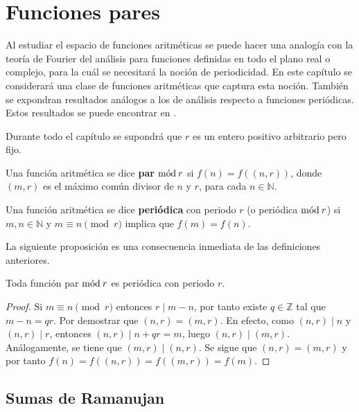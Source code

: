 \newpage
\section{Funciones pares}

Al estudiar el espacio de funciones aritméticas se puede hacer una analogía con la teoría de Fourier del análisis para funciones definidas en todo el plano real o complejo, para la cuál se necesitará la noción de periodicidad. En este capítulo se considerará una clase de funciones aritméticas que captura esta noción. También se expondran resultados análogos a los de análisis respecto a funciones periódicas. Estos resultados se puede encontrar en \cite{Coh1}.

\begin{remark}
Durante todo el capítulo se supondrá que $r$ es un entero positivo arbitrario pero fijo.
\end{remark}

\begin{definition}
Una función aritmética se dice \textbf{par} $\mathrm{m\acute{o}d\:}r$ si $f(n)=f((n,r))$, donde $(m,r)$ es el máximo común divisor de $n$ y $r$, para cada $n \in \mathbb{N}$.
\end{definition}

\begin{definition}
Una función aritmética se dice \textbf{periódica} con periodo $r$ (o periódica $\mathrm{m\acute{o}d\:}r$) si $m, n \in \mathbb{N}$ y $m \equiv n \pmod{r}$ implica que $f(m)=f(n)$.
\end{definition}

La siguiente proposición es una consecuencia inmediata de las definiciones anteriores.

\begin{proposition}\label{prop:mod->per}
Toda función par $\mathrm{m\acute{o}d\:}r$ es periódica con periodo $r$.
\end{proposition}
\begin{proof}
Si $m \equiv n \pmod{r}$ entonces $r \mid m-n$, por tanto existe $q \in \mathbb{Z}$ tal que $m-n=q r$. Por demostrar que $(n,r)=(m,r)$. En efecto, como $(n,r) \mid n$ y $(n,r) \mid r$, entonces $(n,r) \mid n+qr=m$, luego $(n,r) \mid (m,r)$. Análogamente, se tiene que $(m,r) \mid (n,r)$. Se sigue que $(n,r)=(m,r)$ y por tanto $f(n)=f((n,r))=f((m,r))=f(m)$.
\end{proof}

\subsection{Sumas de Ramanujan}

